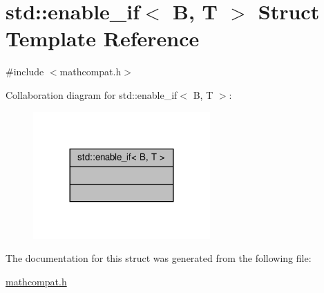 \hypertarget{structstd_1_1enable__if}{}\section{std\+:\+:enable\+\_\+if$<$ B, T $>$ Struct Template Reference}
\label{structstd_1_1enable__if}


{\ttfamily \#include $<$mathcompat.\+h$>$}



Collaboration diagram for std\+:\+:enable\+\_\+if$<$ B, T $>$\+:\nopagebreak
\begin{figure}[H]
\begin{center}
\leavevmode
\includegraphics[width=192pt]{df/d1d/structstd_1_1enable__if__coll__graph}
\end{center}
\end{figure}


The documentation for this struct was generated from the following file\+:\begin{DoxyCompactItemize}
\item 
\hyperlink{mathcompat_8h}{mathcompat.\+h}\end{DoxyCompactItemize}
